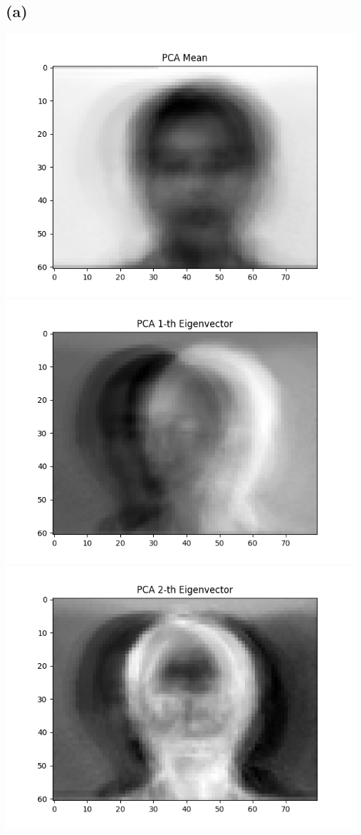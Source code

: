 \subsection{(a)}

\includegraphics[width=13cm]{PCA_Eigen0.png}\\
\includegraphics[width=13cm]{PCA_Eigen1.png}\\
\includegraphics[width=13cm]{PCA_Eigen2.png}\\

